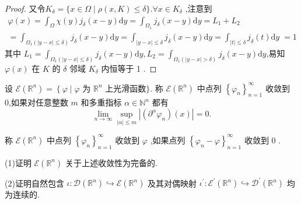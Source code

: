\documentclass[lang=cn,newtx,10pt,scheme=chinese,thmcnt=chapter]{elegantbook}
\begin{document}
\begin{problemset}
\begin{proof}
又令\( {K}_{\delta } = \{ x \in  \Omega  \mid  \rho \left( {x,K}\right)  \leqslant  \delta \} . \)\( \forall x \in  {K}_{\delta } \) ,注意到
\begin{equation*}
    \begin{aligned}
        \varphi \left( x\right) =
 {\int }_{\Omega }\chi \left( y\right) {j}_{\delta }\left( {x - y}\right) \mathrm{d}y = {\int }_{{\Omega }_{1}}{j}_{\delta }\left( {x - y}\right) \mathrm{d}y= {L}_{1} + {L}_{2}\\= {\int }_{{\Omega }_{1}\left( {\left| {y - x}\right|  \leqslant  \delta }\right) }{j}_{\delta }\left( {x - y}\right) \mathrm{d}y ={\int }_{\left| {y - x}\right|  \leqslant  \delta }{j}_{\delta }\left( {x - y}\right) \mathrm{d}y = {\int }_{\left| t\right|  \leqslant  \delta }{j}_{\delta }\left( t\right) \mathrm{d}y\;=1
    \end{aligned}
\end{equation*}  其中 \( {L}_{1} = {\int }_{{\Omega }_{1}\left( {\left| {y - x}\right|  \leqslant  \delta }\right) }{j}_{\delta }\left( {x - y}\right) \mathrm{d}y,{L}_{2} = {\int }_{{\Omega }_{1}\left( {\left| {y - x}\right|  > \delta }\right) }{j}_{\delta }\left( {x - y}\right) \mathrm{d}y \),易知 \( \varphi \left( x\right) \) 在 \( K \) 的 \( \delta \) 邻域 \( {K}_{\delta } \) 内恒等于 1 .
\end{proof}
\item 设 \(\mathcal{E}\left( {\mathbb{R}}^{n}\right)  = \left\{  {\varphi  \mid  \varphi }\right.\) 为 \({\mathbb{R}}^{n}\) 上光滑函数$\}$. 称 \(\mathcal{E}\left( {\mathbb{R}}^{n}\right)\) 中点列 \({\left\{  {\varphi }_{n}\right\}  }_{n = 1}^{\infty }\) 收敛到 0,如果对任意整数 \(m\) 和多重指标 \(\alpha  \in  {\mathbb{N}}^{n}\) 都有
\begin{equation*}
\mathop{\lim }\limits_{{n \rightarrow  \infty }}\mathop{\sup }\limits_{{\left| \alpha\right|  \leqslant  m}}\left| {\left( {{\partial }^{\alpha }{\varphi }_{n}}\right) \left( x\right) }\right|  = 0.
\end{equation*}

称 \(\mathcal{E}\left( {\mathbb{R}}^{n}\right)\) 中点列 \({\left\{  {\varphi }_{n}\right\}  }_{n = 1}^{\infty }\) 收敛到 \(\varphi\) ,如果点列 \({\left\{  {\varphi }_{n} - \varphi \right\}  }_{n = 1}^{\infty }\) 收敛到 0 .

(1)证明 \(\mathcal{E}\left( {\mathbb{R}}^{n}\right)\) 关于上述收敛性为完备的.

(2)证明自然包含 \(\iota  : \mathcal{D}\left( {\mathbb{R}}^{n}\right)  \hookrightarrow  \mathcal{E}\left( {\mathbb{R}}^{n}\right)\) 及其对偶映射 \({\iota }^{\prime } : {\mathcal{E}}^{\prime }\left( {\mathbb{R}}^{n}\right)  \hookrightarrow  {\mathcal{D}}^{\prime }\left( {\mathbb{R}}^{n}\right)\) 均为连续的.


\end{problemset}
\end{document}

